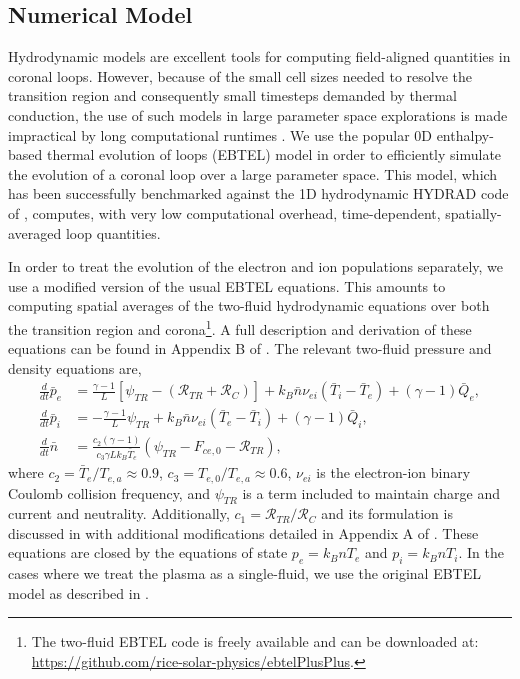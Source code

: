 \documentclass[preprint,linenumbers]{aastex}
\begin{document}
	\subsection{Numerical Model}
	\label{subsec:numerics}
	\par Hydrodynamic models are excellent tools for computing field-aligned quantities in coronal loops. However, because of the small cell sizes needed to resolve the transition region and consequently small timesteps demanded by thermal conduction, the use of such models in large parameter space explorations is made impractical by long computational runtimes \citep{bradshaw_influence_2013}. We use the popular 0D enthalpy-based thermal evolution of loops (EBTEL) model \citep{klimchuk_highly_2008,cargill_enthalpy-based_2012,cargill_enthalpy-based_2012-1,cargill_modelling_2015} in order to efficiently simulate the evolution of a coronal loop over a large parameter space. This model, which has been successfully benchmarked against the 1D hydrodynamic HYDRAD code of \citet{bradshaw_influence_2013}, computes, with very low computational overhead, time-dependent, spatially-averaged loop quantities.
	\par In order to treat the evolution of the electron and ion populations separately, we use a modified version of the usual EBTEL equations. This amounts to computing spatial averages of the two-fluid hydrodynamic equations over both the transition region and corona\footnote{The two-fluid EBTEL  code is freely available and can be downloaded at: \url{https://github.com/rice-solar-physics/ebtelPlusPlus}.}. A full description and derivation of these equations can be found in Appendix B of . The relevant two-fluid pressure and density equations are,
	\begin{align}
		\frac{d}{dt}\bar{p}_e &= \frac{\gamma - 1}{L}\left\lbrack\psi_{TR} - (\mathcal{R}_{TR} + \mathcal{R}_C)\right\rbrack + k_B\bar{n}\nu_{ei}(\bar{T}_i - \bar{T}_e) + (\gamma - 1)\bar{Q}_e,\label{eq:ebtel2fl_pe}\\
		\frac{d}{dt}\bar{p}_i &= -\frac{\gamma - 1}{L}\psi_{TR} + k_B\bar{n}\nu_{ei}(\bar{T}_e - \bar{T}_i) + (\gamma - 1)\bar{Q}_i,\label{eq:ebtel2fl_pi}\\
		\frac{d}{dt}\bar{n} &= \frac{c_2(\gamma - 1)}{c_3\gamma Lk_B\bar{T}_e}\left(\psi_{TR} - F_{ce,0} - \mathcal{R}_{TR}\right),\label{eq:ebtel2fl_n}
	\end{align}
	where $c_2=\bar{T}_e/T_{e,a}\approx0.9$, $c_3=T_{e,0}/T_{e,a}\approx0.6$, $\nu_{ei}$ is the electron-ion binary Coulomb collision frequency, and $\psi_{TR}$ is a term included to maintain charge and current and neutrality. Additionally, $c_1=\mathcal{R}_{TR}/\mathcal{R}_C$ and its formulation is discussed in \citet{cargill_enthalpy-based_2012} with additional modifications detailed in Appendix A of . These equations are closed by the equations of state $p_e=k_BnT_e$ and $p_i=k_BnT_i$. In the cases where we treat the plasma as a single-fluid, we use the original EBTEL model as described in \citet{klimchuk_highly_2008,cargill_enthalpy-based_2012}.
\end{document}

